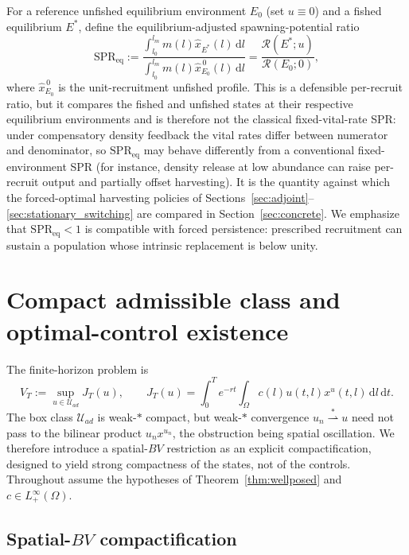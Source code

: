 \documentclass[pdflatex,sn-mathphys-num]{sn-jnl}
\newcommand{\Om}{\Omega}
\newcommand{\dd}{\,\mathrm{d}}
\newcommand{\Uad}{\mathcal{U}_{ad}}
\theoremstyle{plain}
\theoremstyle{definition}
\theoremstyle{remark}
\begin{document}
For a reference unfished equilibrium environment $E_0$ (set $u\equiv0$) and a
fished equilibrium $E^*$, define the equilibrium-adjusted spawning-potential
ratio
\[
\mathrm{SPR}_{\mathrm{eq}}
:=
\frac{\displaystyle\int_{l_0}^{l_m}m(l)\hat x_{E^*}(l)\dd l}
{\displaystyle\int_{l_0}^{l_m}m(l)\hat x_{E_0}^{\,0}(l)\dd l}
=\frac{\mathcal R(E^*;u)}{\mathcal R(E_0;0)},
\]
where $\hat x_{E_0}^{\,0}$ is the unit-recruitment unfished profile. This is a
defensible per-recruit ratio, but it compares the fished and unfished states at
their respective equilibrium environments and is therefore not the classical
fixed-vital-rate SPR: under compensatory density feedback the vital rates differ
between numerator and denominator, so $\mathrm{SPR}_{\mathrm{eq}}$ may behave
differently from a conventional fixed-environment SPR (for instance, density
release at low abundance can raise per-recruit output and partially offset
harvesting). It is the quantity against which the forced-optimal harvesting
policies of Sections~\ref{sec:adjoint}--\ref{sec:stationary_switching} are compared
in Section~\ref{sec:concrete}. We emphasize that
$\mathrm{SPR}_{\mathrm{eq}}<1$ is compatible with forced persistence: prescribed
recruitment can sustain a population whose intrinsic replacement is below unity.

\section{Compact admissible class and optimal-control existence}
\label{sec:control_existence}

The finite-horizon problem is
\[
V_T:=\sup_{u\in\Uad}J_T(u),
\qquad
J_T(u)=\int_0^T e^{-rt}\int_\Om c(l)u(t,l)x^u(t,l)\dd l\dd t.
\]
The box class $\Uad$ is weak-$\ast$ compact, but weak-$\ast$ convergence
$u_n\overset{\ast}{\rightharpoonup}u$ need not pass to the bilinear product
$u_nx^{u_n}$, the obstruction being spatial oscillation. We therefore introduce a
spatial-$BV$ restriction as an explicit compactification, designed to yield strong
compactness of the states, not of the controls. Throughout assume the
hypotheses of Theorem~\ref{thm:wellposed} and $c\in L^\infty_+(\Om)$.

\subsection{Spatial-$BV$ compactification}
\label{subsec:BV_compactification}
\end{document}
